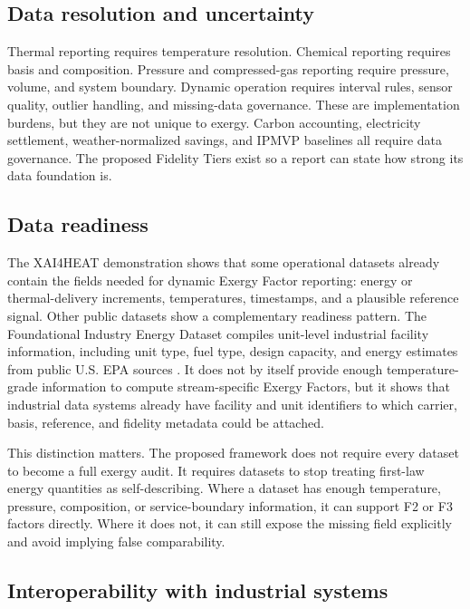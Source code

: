 \documentclass[11pt]{article}
\begin{document}
\subsection{Data resolution and uncertainty}

Thermal reporting requires temperature resolution. Chemical reporting requires basis and composition. Pressure and compressed-gas reporting require pressure, volume, and system boundary. Dynamic operation requires interval rules, sensor quality, outlier handling, and missing-data governance. These are implementation burdens, but they are not unique to exergy. Carbon accounting, electricity settlement, weather-normalized savings, and IPMVP baselines all require data governance. The proposed Fidelity Tiers exist so a report can state how strong its data foundation is.

\subsection{Data readiness}

The XAI4HEAT demonstration shows that some operational datasets already contain the fields needed for dynamic Exergy Factor reporting: energy or thermal-delivery increments, temperatures, timestamps, and a plausible reference signal. Other public datasets show a complementary readiness pattern. The Foundational Industry Energy Dataset compiles unit-level industrial facility information, including unit type, fuel type, design capacity, and energy estimates from public U.S. EPA sources \cite{fiedgithub}. It does not by itself provide enough temperature-grade information to compute stream-specific Exergy Factors, but it shows that industrial data systems already have facility and unit identifiers to which carrier, basis, reference, and fidelity metadata could be attached.

This distinction matters. The proposed framework does not require every dataset to become a full exergy audit. It requires datasets to stop treating first-law energy quantities as self-describing. Where a dataset has enough temperature, pressure, composition, or service-boundary information, it can support F2 or F3 factors directly. Where it does not, it can still expose the missing field explicitly and avoid implying false comparability.

\subsection{Interoperability with industrial systems}
\end{document}
